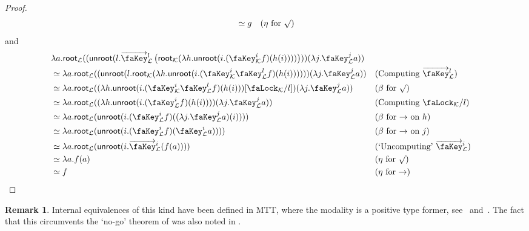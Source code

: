 \documentclass[10pt]{article}
\theoremstyle{definition}
\newtheorem{remark}[theorem]{Remark}
\let\oldequiv\equiv%
\renewcommand{\equiv}{\simeq}
\newcommand{\defeq}{\oldequiv}
\newcommand{\lock}{\text{\faLock}}
\newcommand{\key}{\text{\faKey}}
\newcommand{\lockn}[1]{\mathcal{#1}}
\newcommand{\varkey}[2]{\key_{\lockn{#1}}^{#2}}
\newcommand{\admkey}[2]{\overrightarrow{\key}_{\lockn{#1}}^{#2}}
\newcommand{\locksub}[2]{\lock_{\lockn{#1}}/#2}
\newcommand{\rformu}[1]{\surd #1}
\newcommand{\rintro}[2]{\mathsf{root}_{\lockn{#1}}(#2)}
\newcommand{\relim}[1]{\mathsf{unroot}(#1)}
\begin{document}
\begin{proof}
\begin{align*}
&\defeq g && \text{($\eta$ for $\rformu$)} \\
\end{align*}
and
\begin{align*}
&\lambda a. \rintro{L}{(\relim{l.\admkey{L}{l} \left(\rintro{K}{\lambda h. \relim{i.(\varkey{K}{i} f)(h(i))}}\right)})(\lambda j.\varkey{L}{j} a)} \\
&\defeq \lambda a. \rintro{L}{(\relim{l. \rintro{K}{\lambda h. \relim{i.(\varkey{K}{i} \varkey{L}{l} f)(h(i))}}})(\lambda j.\varkey{L}{j} a)} && \text{(Computing $\admkey{L}{l}$)} \\
&\defeq \lambda a. \rintro{L}{(\lambda h. \relim{i.(\varkey{K}{i} \varkey{L}{l} f)(h(i))}[\locksub{K}{l}])(\lambda j.\varkey{L}{j} a)} && \text{($\beta$ for $\rformu$)} \\
&\defeq \lambda a. \rintro{L}{(\lambda h. \relim{i.( \varkey{L}{i} f)(h(i))})(\lambda j.\varkey{L}{j} a)} && \text{(Computing $\locksub{K}{l}$)} \\
&\defeq \lambda a. \rintro{L}{\relim{i.(\varkey{L}{i} f)((\lambda j.\varkey{L}{j} a)(i))}} && \text{($\beta$ for $\to$ on $h$)} \\
&\defeq \lambda a. \rintro{L}{\relim{i.(\varkey{L}{i} f)(\varkey{L}{i} a))}} && \text{($\beta$ for $\to$ on $j$)} \\
&\defeq \lambda a. \rintro{L}{\relim{i.\admkey{L}{i}(f(a))}} && \text{(`Uncomputing' $\admkey{L}{i}$)} \\
&\defeq \lambda a. f(a) && \text{($\eta$ for $\rformu$)} \\
&\defeq f && \text{($\eta$ for $\to$)} \\
\end{align*}
\end{proof}

\begin{remark}
Internal equivalences of this kind have been defined in MTT, where the modality is a positive type former, see~\cite[Proposition 3.4]{transpension} and~\cite[Section 10.4]{mtt}. The fact that this circumvents the `no-go' theorem of \cite{lops} was also noted in \cite[Section 10.1]{transpension}.
\end{remark}
\end{document}

